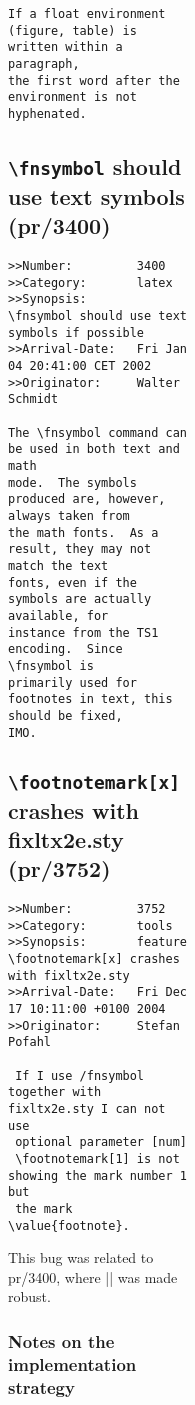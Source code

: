 \documentclass{ltxguide}
\begin{document}
\begin{figure}[tB]
\begin{figure}[t]
\begin{figure}[B]
\begin{figure}[]
\begin{verbatim}
If a float environment (figure, table) is written within a paragraph,
the first word after the environment is not hyphenated.
\end{verbatim}

\subsection{\texttt{\textbackslash fnsymbol} should use text symbols
    (pr/3400)}

\begin{verbatim}
>>Number:         3400
>>Category:       latex
>>Synopsis:       \fnsymbol should use text symbols if possible
>>Arrival-Date:   Fri Jan 04 20:41:00 CET 2002
>>Originator:     Walter Schmidt

The \fnsymbol command can be used in both text and math
mode.  The symbols produced are, however, always taken from
the math fonts.  As a result, they may not match the text
fonts, even if the symbols are actually available, for
instance from the TS1 encoding.  Since \fnsymbol is
primarily used for footnotes in text, this should be fixed,
IMO.
\end{verbatim}





\subsection{\texttt{\textbackslash footnotemark[x]} crashes with fixltx2e.sty
   (pr/3752)}

\begin{verbatim}
>>Number:         3752
>>Category:       tools
>>Synopsis:       feature \footnotemark[x] crashes with fixltx2e.sty
>>Arrival-Date:   Fri Dec 17 10:11:00 +0100 2004
>>Originator:     Stefan Pofahl

 If I use /fnsymbol together with fixltx2e.sty I can not use
 optional parameter [num]
 \footnotemark[1] is not showing the mark number 1 but
 the mark \value{footnote}.
\end{verbatim}
This bug was related to pr/3400, where |\@fnsymbol| was made robust.

\subsubsection{Notes on the implementation strategy}


\end{figure}
\end{figure}
\end{figure}
\end{figure}
\end{document}

